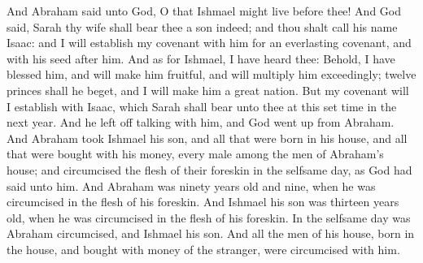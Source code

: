 \begin{biblechapter}
\verse And Abraham said unto God, O that Ishmael might live before thee!
\verse And God said, Sarah thy wife shall bear thee a son indeed; and thou shalt call his name Isaac: and I will establish my covenant with him for an everlasting covenant, and with his seed after him.
\verse And as for Ishmael, I have heard thee: Behold, I have blessed him, and will make him fruitful, and will multiply him exceedingly; twelve princes shall he beget, and I will make him a great nation.
\verse But my covenant will I establish with Isaac, which Sarah shall bear unto thee at this set time in the next year.
\verse And he left off talking with him, and God went up from Abraham.
\verse And Abraham took Ishmael his son, and all that were born in his house, and all that were bought with his money, every male among the men of Abraham's house; and circumcised the flesh of their foreskin in the selfsame day, as God had said unto him.
\verse And Abraham was ninety years old and nine, when he was circumcised in the flesh of his foreskin.
\verse And Ishmael his son was thirteen years old, when he was circumcised in the flesh of his foreskin.
\verse In the selfsame day was Abraham circumcised, and Ishmael his son.
\verse And all the men of his house, born in the house, and bought with money of the stranger, were circumcised with him.
\end{biblechapter}

